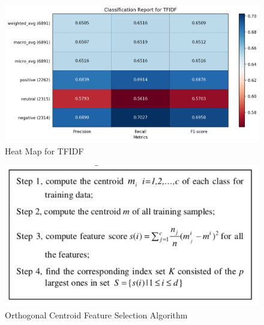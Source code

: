 \documentclass[titlepage]{article}
\begin{document}
  \begin{figure}[h!]
  \centering
 \includegraphics[width=\linewidth]{pics/TFIDF.png}
    \caption{Heat Map for TFIDF}
    \label{heat_map_tfidf}
      \end{figure}
    

  \begin{figure}[h!]
  \centering
 \includegraphics[width=0.7\linewidth]{pics/ocfs.jpeg}
    \caption{Orthogonal Centroid Feature Selection Algorithm}
        \label{ocfs}
      \end{figure}


\newpage


\end{document}
